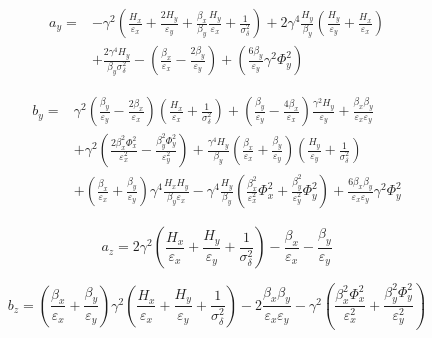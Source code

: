 \begin{equation}
    \begin{aligned}
    a_y = & - \gamma^2 \left(\frac{H_x}{\varepsilon_x} + \frac{2 H_y}{\varepsilon_y} + \frac{\beta_x}{\beta_y} \frac{H_y}{\varepsilon_x} + \frac{1}{\sigma_{\delta}^{2}}\right) + 2 \gamma^4 \frac{H_y}{\beta_y} \left(\frac{H_y}{\varepsilon_y} + \frac{H_x}{\varepsilon_x}\right) \\
          & + \frac{2 \gamma^4 H_y}{\beta_y \sigma_{\delta}^{2}} - \left(\frac{\beta_x}{\varepsilon_x} - \frac{2 \beta_y}{\varepsilon_y}\right) + \left(\frac{6 \beta_y}{\varepsilon_y} \gamma^2 \Phi_y^{2}\right)
    \end{aligned}
    \label{equation:bm_ay}
\end{equation}

\begin{equation}
    \begin{aligned}
    b_y = & \gamma^2 \left(\frac{\beta_y}{\varepsilon_y} - \frac{2 \beta_x}{\varepsilon_x}\right) \left(\frac{H_x}{\varepsilon_x} + \frac{1}{\sigma_{\delta}^{2}}\right) + \left(\frac{\beta_y}{\varepsilon_y} - \frac{4 \beta_x}{\varepsilon_x}\right) \frac{\gamma^2 H_y}{\varepsilon_y} + \frac{\beta_x \beta_y}{\varepsilon_x \varepsilon_y} \\
          & + \gamma^2 \left(\frac{2 \beta_x^{2} \Phi_x^{2}}{\varepsilon_x^{2}} - \frac{\beta_y^{2} \Phi_y^{2}}{\varepsilon_y^{2}}\right) + \frac{\gamma^4 H_y}{\beta_y} \left(\frac{\beta_x}{\varepsilon_x} + \frac{\beta_y}{\varepsilon_y}\right) \left(\frac{H_y}{\varepsilon_y} + \frac{1}{\sigma_{\delta}^{2}}\right)\\
          & + \left(\frac{\beta_x}{\varepsilon_x} + \frac{\beta_y}{\varepsilon_y}\right) \gamma^4 \frac{H_x H_y}{\beta_y \varepsilon_x} - \gamma^4 \frac{H_y}{\beta_y} \left(\frac{\beta_x^{2}}{\varepsilon_x^{2}} \Phi_x^{2} + \frac{\beta_y^{2}}{\varepsilon_y^{2}} \Phi_y^{2}\right) + \frac{6 \beta_x \beta_y}{\varepsilon_x \varepsilon_y} \gamma^2 \Phi_y^{2}
    \end{aligned}
    \label{equation:bm_by}
\end{equation}

\begin{equation}
    a_z = 2 \gamma^2 \left(\frac{H_x}{\varepsilon_x} + \frac{H_y}{\varepsilon_y} + \frac{1}{\sigma_{\delta}^{2}}\right) - \frac{\beta_x}{\varepsilon_x} - \frac{\beta_y}{\varepsilon_y}
    \label{equation:bm_az}
\end{equation}

\begin{equation}
    b_z = \left(\frac{\beta_x}{\varepsilon_x} + \frac{\beta_y}{\varepsilon_y}\right) \gamma^2 \left(\frac{H_x}{\varepsilon_x} + \frac{H_y}{\varepsilon_y} + \frac{1}{\sigma_{\delta}^{2}}\right) - 2 \frac{\beta_x \beta_y}{\varepsilon_x \varepsilon_y} - \gamma^2 \left(\frac{\beta_x^{2} \Phi_x^{2}}{\varepsilon_x^{2}} + \frac{\beta_y^{2} \Phi_y^{2}}{\varepsilon_y^{2}}\right)
    \label{equation:bm_bz}
\end{equation}

